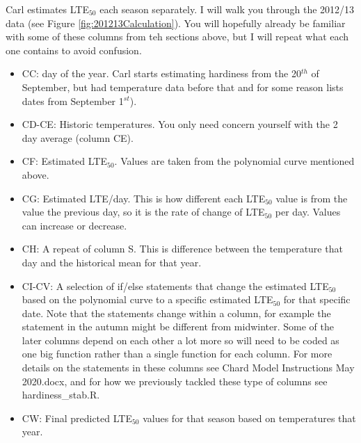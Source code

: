 \documentclass[11pt,letter]{article}
\begin{document}
Carl estimates LTE$_{50}$ each season separately. I will walk you through the 2012/13 data (see Figure \ref{fig:201213Calculation}). You will hopefully already be familiar with some of these columns from teh sections above, but I will repeat what each one contains to avoid confusion.
\begin{itemize}
	\item CC: day of the year. Carl starts estimating hardiness from the 20$^{th}$ of September, but had temperature data before that and for some reason lists dates from September 1$^{st}$). 
	\item CD-CE: Historic temperatures. You only need concern yourself with the 2 day average (column CE). 
	\item CF: Estimated LTE$_{50}$. Values are taken from the polynomial curve mentioned above. 
	\item CG: Estimated LTE/day. This is how different each LTE$_{50}$ value is from the value the previous day, so it is the rate of change of LTE$_{50}$ per day. Values can increase or decrease. 
	\item CH: A repeat of column S. This is difference between the temperature that day and the historical mean for that year. 
	\item CI-CV: A selection of if/else statements that change the estimated LTE$_{50}$ based on the polynomial curve to a specific estimated LTE$_{50}$ for that specific date. Note that the statements change within a column, for example the statement in the autumn might be different from midwinter. Some of the later columns depend on each other a lot more so will need to be coded as one big function rather than a single function for each column. For more details on the statements in these columns see Chard Model Instructions May 2020.docx, and for how we previously tackled these type of columns see hardiness\_stab.R. 
	\item CW: Final predicted LTE$_{50}$ values for that season based on temperatures that year.
\end{itemize}
\end{document}
